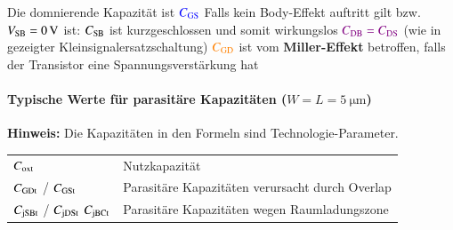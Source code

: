 \begin{outline}
    \1 Die domnierende Kapazität ist ${\color{blue} C_{\rm GS} }$
    \1 Falls kein Body-Effekt auftritt gilt bzw. $V_{\rm SB} = \qty{0}{\volt}$ ist:
        \2 $C_{\rm SB}$ ist kurzgeschlossen und somit wirkungslos
        \2 ${\color{violet} C_{\rm DB} = C_{\rm DS} }$ (wie in gezeigter Kleinsignalersatzschaltung)
    \1 ${\color{orange} C_{\rm GD} }$ ist vom \textbf{Miller-Effekt} betroffen, falls der Transistor eine Spannungsverstärkung hat
\end{outline}


\paragraph{Typische Werte für parasitäre Kapazitäten ($W = L = \qty{5}{\micro \meter}$)}


\medskip

\textbf{Hinweis:} Die Kapazitäten in den Formeln sind Technologie-Parameter.

\smallskip

\begin{tabular}{ll}
    $C_{\rm oxt}$                                   & Nutzkapazität                                     \\
    $C_{\rm GDt}$ / $C_{\rm GSt}$                   & Parasitäre Kapazitäten verursacht durch Overlap   \\
    $C_{\rm jSBt}$ / $C_{\rm jDSt}$ $C_{\rm jBCt}$  & Parasitäre Kapazitäten wegen Raumladungszone      \\
\end{tabular}


